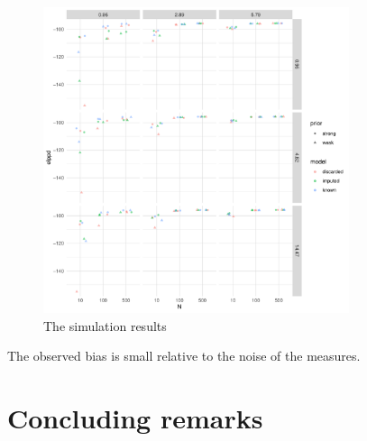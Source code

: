 \begin{figure}
    \centering
    \includegraphics[width=0.8\textwidth]{./figures/ch-2/sim-results-elppd.pdf}
    \caption{The simulation results}
    \label{fig:sim-study-elppd}
\end{figure}

The observed bias is small relative to the noise of the measures.

\section{Concluding remarks}

